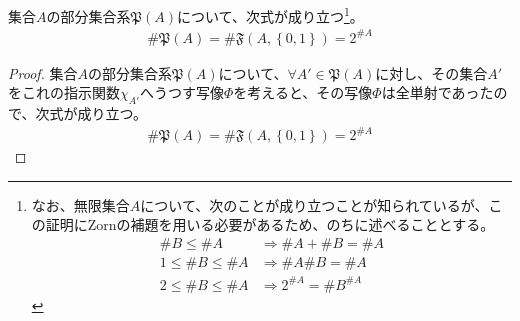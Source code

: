 \documentclass[dvipdfmx]{jsarticle}
\begin{document}
\begin{thm}\label{1.2.8.10}
集合$A$の部分集合系$\mathfrak{P}(A)$について、次式が成り立つ\footnote{なお、無限集合$A$について、次のことが成り立つことが知られているが、この証明にZornの補題を用いる必要があるため、のちに述べることとする。
\begin{align*}
  \# B \leq \# A &\Rightarrow \# A + \# B = \# A\\
  1 \leq \# B \leq \# A &\Rightarrow \# A\# B = \# A\\
  2 \leq \# B \leq \# A &\Rightarrow 2^{\# A} = {\# B}^{\# A}
\end{align*}}。
\begin{align*}
\# {\mathfrak{P}(A)} = \# {\mathfrak{F}\left( A,\left\{ 0,1 \right\} \right)} = 2^{\# A}
\end{align*}
\end{thm}
\begin{proof}
集合$A$の部分集合系$\mathfrak{P}(A)$について、$\forall A'\in \mathfrak{P}(A)$に対し、その集合$A'$をこれの指示関数$\chi_{A'}$へうつす写像$\Phi$を考えると、その写像$\Phi$は全単射であったので、次式が成り立つ。
\begin{align*}
\# {\mathfrak{P}(A)} = \# {\mathfrak{F}\left( A,\left\{ 0,1 \right\} \right)} = 2^{\# A}
\end{align*}
\end{proof}
\end{document}
